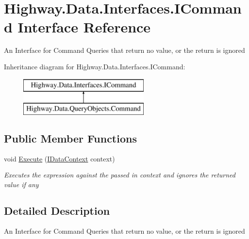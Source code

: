 \hypertarget{interface_highway_1_1_data_1_1_interfaces_1_1_i_command}{\section{Highway.\-Data.\-Interfaces.\-I\-Command Interface Reference}
\label{interface_highway_1_1_data_1_1_interfaces_1_1_i_command}
}


An Interface for Command Queries that return no value, or the return is ignored  


Inheritance diagram for Highway.\-Data.\-Interfaces.\-I\-Command\-:\begin{figure}[H]
\begin{center}
\leavevmode
\includegraphics[height=2.000000cm]{interface_highway_1_1_data_1_1_interfaces_1_1_i_command}
\end{center}
\end{figure}
\subsection*{Public Member Functions}
\begin{DoxyCompactItemize}
\item 
void \hyperlink{interface_highway_1_1_data_1_1_interfaces_1_1_i_command_a4c4bebaba6455031b1fc9a18a2150378}{Execute} (\hyperlink{interface_highway_1_1_data_1_1_interfaces_1_1_i_data_context}{I\-Data\-Context} context)
\begin{DoxyCompactList}\small\item\em Executes the expression against the passed in context and ignores the returned value if any \end{DoxyCompactList}\end{DoxyCompactItemize}


\subsection{Detailed Description}
An Interface for Command Queries that return no value, or the return is ignored 



